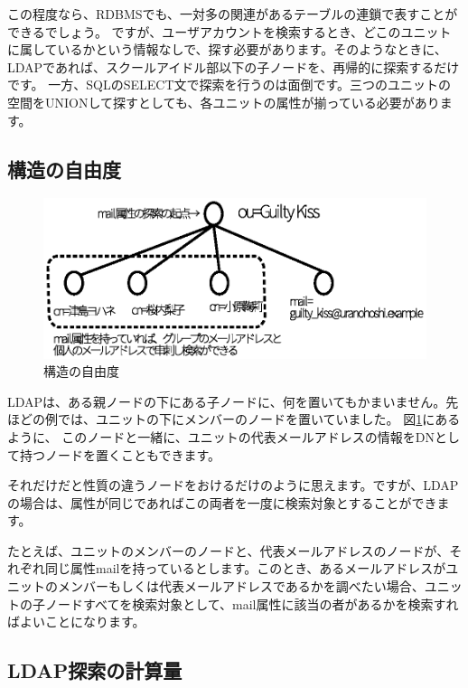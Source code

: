この程度なら、RDBMSでも、一対多の関連があるテーブルの連鎖で表すことができるでしょう。
ですが、ユーザアカウントを検索するとき、どこのユニットに属しているかという情報なしで、探す必要があります。そのようなときに、LDAPであれば、スクールアイドル部以下の子ノードを、再帰的に探索するだけです。
一方、SQLのSELECT文で探索を行うのは面倒です。三つのユニットの空間をUNIONして探すとしても、各ユニットの属性が揃っている必要があります。

\subsection{構造の自由度}

\begin{figure}[htbp]
	\includegraphics[width=12cm,clip]{draw/nodesearch.eps}
	\caption{構造の自由度}
	\label{fig:nodedn}
\end{figure}

LDAPは、ある親ノードの下にある子ノードに、何を置いてもかまいません。先ほどの例では、ユニットの下にメンバーのノードを置いていました。
図\ref{fig:nodedn}にあるように、
このノードと一緒に、ユニットの代表メールアドレスの情報をDNとして持つノードを置くこともできます。

それだけだと性質の違うノードをおけるだけのように思えます。ですが、LDAPの場合は、属性が同じであればこの両者を一度に検索対象とすることができます。

たとえば、ユニットのメンバーのノードと、代表メールアドレスのノードが、それぞれ同じ属性mailを持っているとします。このとき、あるメールアドレスがユニットのメンバーもしくは代表メールアドレスであるかを調べたい場合、ユニットの子ノードすべてを検索対象として、mail属性に該当の者があるかを検索すればよいことになります。


\subsection{LDAP探索の計算量}

